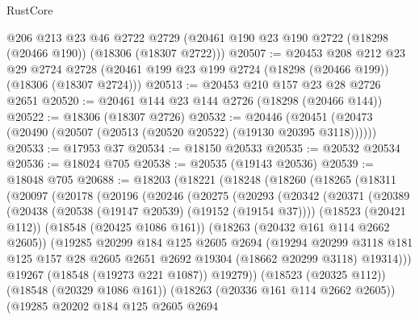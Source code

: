 \begin{lexlean}{RustCore}
\begin{coremodule}
    @206
    @213
    @23
    @46
    @2722
    @2729
    (@20461 @190 @23 @190 @2722 (@18298 (@20466 @190)) (@18306 (@18307 @2722)))
@20507 := @20453
    @208
    @212
    @23
    @29
    @2724
    @2728
    (@20461 @199 @23 @199 @2724 (@18298 (@20466 @199)) (@18306 (@18307 @2724)))
@20513 := @20453 @210 @157 @23 @28 @2726 @2651
@20520 := @20461 @144 @23 @144 @2726 (@18298 (@20466 @144))
@20522 := @18306 (@18307 @2726)
@20532 := @20446 (@20451 (@20473 (@20490 (@20507 (@20513 (@20520 @20522) (@19130 @20395 @3118))))))
@20533 := @17953 @37
@20534 := @18150 @20533
@20535 := @20532 @20534
@20536 := @18024 @705
@20538 := @20535 (@19143 @20536)
@20539 := @18048 @705
@20688 := @18203
    (@18221
      (@18248
        (@18260
          (@18265
            (@18311
              (@20097
                (@20178
                  (@20196
                    (@20246
                      (@20275
                        (@20293
                          (@20342
                            (@20371
                              (@20389
                                (@20438 (@20538 (@19147 @20539) (@19152 (@19154 @37))))
                                (@18523 (@20421 @112))
                                (@18548 (@20425 @1086 @161))
                                (@18263 (@20432 @161 @114 @2662 @2605))
                                (@19285
                                  @20299
                                  @184
                                  @125
                                  @2605
                                  @2694
                                  (@19294
                                    @20299
                                    @3118
                                    @181
                                    @125
                                    @157
                                    @28
                                    @2605
                                    @2651
                                    @2692
                                    @19304
                                    (@18662 @20299 @3118)
                                    @19314)))
                              @19267
                              (@18548 (@19273 @221 @1087))
                              @19279))
                          (@18523 (@20325 @112))
                          (@18548 (@20329 @1086 @161))
                          (@18263 (@20336 @161 @114 @2662 @2605))
                          (@19285
                            @20202
                            @184
                            @125
                            @2605
                            @2694

\end{coremodule}
\end{lexlean}
